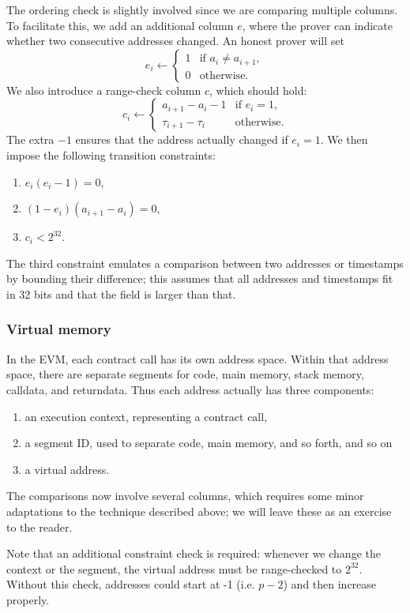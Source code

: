 The ordering check is slightly involved since we are comparing multiple columns. To facilitate this, we add an additional column $e$, where the prover can indicate whether two consecutive addresses changed. An honest prover will set
$$
e_i \leftarrow \begin{cases}
  1 & \text{if } a_i \neq a_{i + 1}, \\
  0 & \text{otherwise}.
\end{cases}
$$
We also introduce a range-check column $c$, which should hold:
$$
c_i \leftarrow \begin{cases}
  a_{i + 1} - a_i - 1 & \text{if } e_i = 1, \\
  \tau_{i+1} - \tau_i & \text{otherwise}.
\end{cases}
$$
The extra $-1$ ensures that the address actually changed if $e_i = 1$.
We then impose the following transition constraints:
\begin{enumerate}
  \item $e_i (e_i - 1) = 0$,
  \item $(1 - e_i) (a_{i + 1} - a_i) = 0$,
  \item $c_i < 2^{32}$.
\end{enumerate}
The third constraint emulates a comparison between two addresses or timestamps by bounding their difference; this assumes that all addresses and timestamps fit in 32 bits and that the field is larger than that.

\subsubsection{Virtual memory}

In the EVM, each contract call has its own address space. Within that address space, there are separate segments for code, main memory, stack memory, calldata, and returndata. Thus each address actually has three components:
\begin{enumerate}
  \item an execution context, representing a contract call,
  \item a segment ID, used to separate code, main memory, and so forth, and so on
  \item a virtual address.
\end{enumerate}
The comparisons now involve several columns, which requires some minor adaptations to the technique described above; we will leave these as an exercise to the reader.

Note that an additional constraint check is required: whenever we change the context or the segment, the virtual address must be range-checked to $2^{32}$.
Without this check, addresses could start at -1 (i.e. $p - 2$) and then increase properly.

